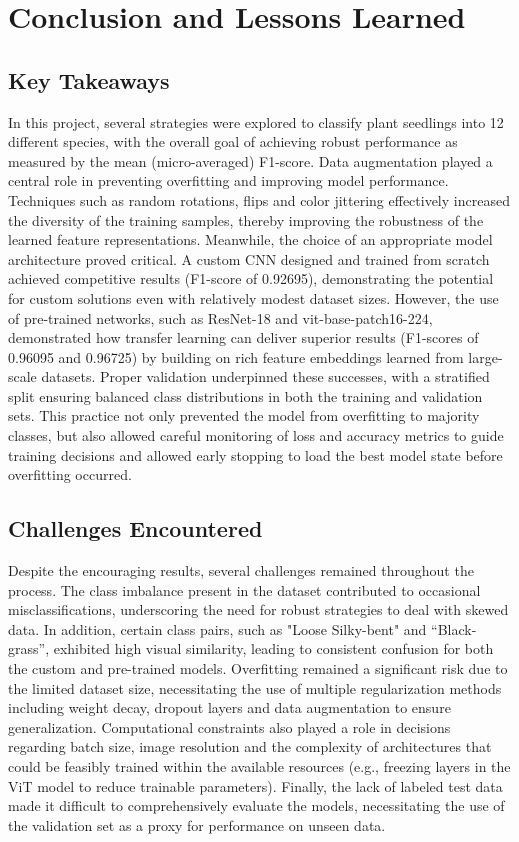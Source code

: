 \section{Conclusion and Lessons Learned}

\subsection{Key Takeaways}

In this project, several strategies were explored to classify plant seedlings into 12 different species, with the overall goal of achieving robust performance as measured by the mean (micro-averaged) F1-score. Data augmentation played a central role in preventing overfitting and improving model performance. Techniques such as random rotations, flips and color jittering effectively increased the diversity of the training samples, thereby improving the robustness of the learned feature representations. Meanwhile, the choice of an appropriate model architecture proved critical. A custom CNN designed and trained from scratch achieved competitive results (F1-score of 0.92695), demonstrating the potential for custom solutions even with relatively modest dataset sizes. However, the use of pre-trained networks, such as ResNet-18 and vit-base-patch16-224, demonstrated how transfer learning can deliver superior results (F1-scores of 0.96095 and 0.96725) by building on rich feature embeddings learned from large-scale datasets. Proper validation underpinned these successes, with a stratified split ensuring balanced class distributions in both the training and validation sets. This practice not only prevented the model from overfitting to majority classes, but also allowed careful monitoring of loss and accuracy metrics to guide training decisions and allowed early stopping to load the best model state before overfitting occurred.

\subsection{Challenges Encountered}

Despite the encouraging results, several challenges remained throughout the process. The class imbalance present in the dataset contributed to occasional misclassifications, underscoring the need for robust strategies to deal with skewed data. In addition, certain class pairs, such as "Loose Silky-bent" and ``Black-grass'', exhibited high visual similarity, leading to consistent confusion for both the custom and pre-trained models. Overfitting remained a significant risk due to the limited dataset size, necessitating the use of multiple regularization methods including weight decay, dropout layers and data augmentation to ensure generalization. Computational constraints also played a role in decisions regarding batch size, image resolution and the complexity of architectures that could be feasibly trained within the available resources (e.g., freezing layers in the ViT model to reduce trainable parameters). Finally, the lack of labeled test data made it difficult to comprehensively evaluate the models, necessitating the use of the validation set as a proxy for performance on unseen data.

